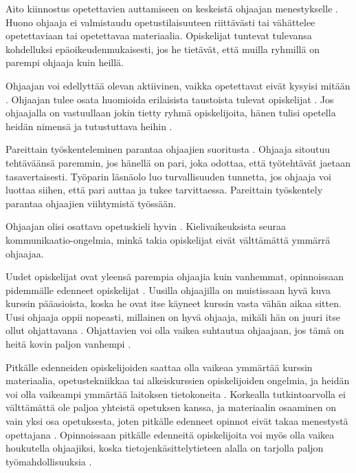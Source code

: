 \documentclass[finnish]{tktltiki2}
\theoremstyle{definition}
\theoremstyle{remark}
\begin{document}
Aito kiinnostus opetettavien auttamiseen on keskeistä ohjaajan menestykselle \cite{Richards00}. Huono ohjaaja ei valmistaudu opetustilaisuuteen riittävästi tai vähättelee opetettaviaan tai opetettavaa materiaalia. Opiskelijat tuntevat tulevansa kohdelluksi epäoikeudenmukaisesti, jos he tietävät, että muilla ryhmillä on parempi ohjaaja kuin heillä. \par

Ohjaajan voi edellyttää olevan aktiivinen, vaikka opetettavat eivät kysyisi mitään \cite{Vikberg}. Ohjaajan tulee osata huomioida erilaisista taustoista tulevat opiskelijat \cite{Kay98}. Jos ohjaajalla on vastuullaan jokin tietty ryhmä opiskelijoita, hänen tulisi opetella heidän nimensä ja tutustuttava heihin \cite{Bernstein}. \par

Pareittain työskenteleminen parantaa ohjaajien suoritusta \cite{Patitsas12_3}. Ohjaaja sitoutuu tehtäväänsä paremmin, jos hänellä on pari, joka odottaa, että työtehtävät jaetaan tasavertaisesti. Työparin läsnäolo luo turvallisuuden tunnetta, jos ohjaaja voi luottaa siihen, että pari auttaa ja tukee tarvittaessa. Pareittain työskentely parantaa ohjaajien viihtymistä työssään. \par

Ohjaajan olisi osattava opetuskieli hyvin \cite{Richards00}. Kielivaikeuksista seuraa kom\-mu\-ni\-kaa\-tio-on\-gel\-mia, minkä takia opiskelijat eivät välttämättä ymmärrä ohjaajaa. \par

Uudet opiskelijat ovat yleensä parempia ohjaajia kuin vanhemmat, opinnoissaan pidemmälle edenneet opiskelijat \cite{Dickson11}. Uusilla ohjaajilla on muistissaan hyvä kuva kurssin pääasioista, koska he ovat itse käyneet kurssin vasta vähän aikaa sitten. Uusi ohjaaja oppii nopeasti, millainen on hyvä ohjaaja, mikäli hän on juuri itse ollut ohjattavana \cite{Vihavainen, Vikberg}. Ohjattavien voi olla vaikea suhtautua ohjaajaan, jos tämä on heitä kovin paljon vanhempi \cite{Decker06}. \par

Pitkälle edenneiden opiskelijoiden saattaa olla vaikeaa ymmärtää kurssin materiaalia, opetustekniikkaa tai alkeiskurssien opiskelijoiden ongelmia, ja heidän voi olla vaikeampi ymmärtää laitoksen tietokoneita \cite{Reges88}. Korkealla tutkintoarvolla ei välttämättä ole paljoa yhteistä opetuksen kanssa, ja materiaalin osaaminen on vain yksi osa opetuksesta, joten pitkälle edenneet opinnot eivät takaa menestystä opettajana \cite{Baldwin00}. Opinnoissaan pitkälle edenneitä opiskelijoita voi myös olla vaikea houkutella ohjaajiksi, koska tietojenkäsittelytieteen alalla on tarjolla paljon työmahdollisuuksia \cite{Kay98}.  \par
\end{document}
